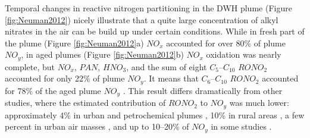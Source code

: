 \documentclass[11pt,a4paper]{article}
\begin{document}
Temporal changes in reactive nitrogen partitioning in the DWH plume (Figure \ref{fig:Neuman2012}) nicely illustrate that a quite large concentration of alkyl nitrates in the air can be build up under certain conditions. While in fresh part of the plume (Figure \ref{fig:Neuman2012}a) $NO_x$ accounted for over 80\% of plume $NO_y$, in aged plumes (Figure \ref{fig:Neuman2012}b) $NO_x$ oxidation was nearly complete, but $NO_x$, $PAN$, $HNO_3$, and the sum of eight $C_5$–$C_{10}$ $RONO_2$ accounted for only 22\% of plume $NO_y$. It means that $C_6$–$C_{10}$ $RONO_2$ accounted for 78\% of the aged plume $NO_y$ \citep{Neuman2012}. This result differs dramatically from other studies, where the estimated contribution of $RONO_2$ to $NO_y$ was much lower: approximately 4\% in urban and petrochemical plumes \citep{Ryerson2003}, 10\% in rural areas \citep{Parrish1993}, a few percent in urban air masses \citep{Ryerson2003}, and up to 10–20\% of $NO_y$ in some studies \citep{Day2003}.
\end{document}

